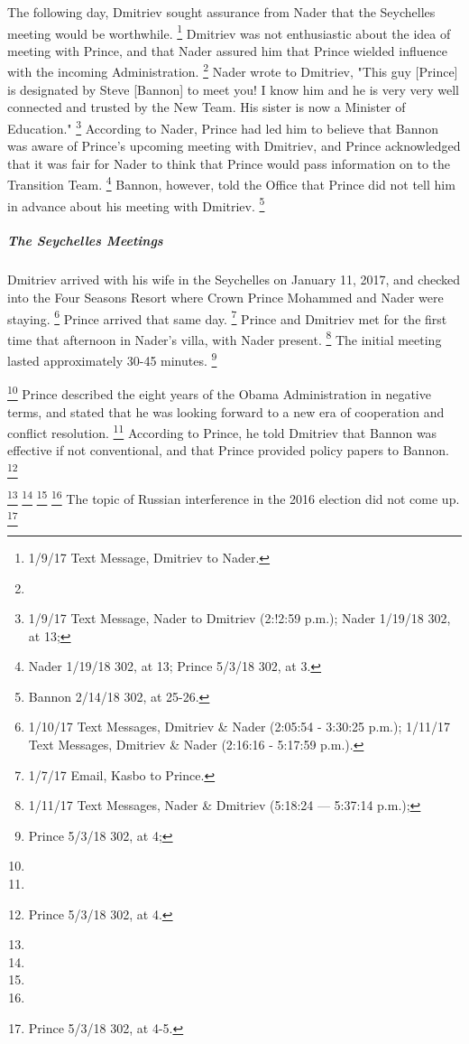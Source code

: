 The following day, Dmitriev sought assurance from Nader that the Seychelles meeting would be worthwhile.%
\footnote{1/9/17 Text Message, Dmitriev to Nader.}
Dmitriev was not enthusiastic about the idea of meeting with Prince, and that Nader assured him that Prince wielded influence with the incoming Administration.%
\footnote{}
Nader wrote to Dmitriev, "This guy [Prince] is designated by Steve [Bannon] to meet you!
I know him and he is very very well connected and trusted by the New Team.
His sister is now a Minister of Education."%
\footnote{1/9/17 Text Message, Nader to Dmitriev (2:!2:59 p.m.);
Nader 1/19/18 302, at 13;
}
According to Nader, Prince had led him to believe that Bannon was aware of Prince's upcoming meeting with Dmitriev, and Prince acknowledged that it was fair for Nader to think that Prince would pass information on to the Transition Team.%
\footnote{Nader 1/19/18 302, at 13;  Prince 5/3/18 302, at 3.}
Bannon, however, told the Office that Prince did not tell him in advance about his meeting with Dmitriev.%
\footnote{Bannon 2/14/18 302, at 25-26.}

\subparagraph{The Seychelles Meetings}

Dmitriev arrived with his wife in the Seychelles on January 11, 2017, and checked into the Four Seasons Resort where Crown Prince Mohammed and Nader were staying.%
\footnote{1/10/17 Text Messages, Dmitriev \& Nader (2:05:54 - 3:30:25 p.m.);
1/11/17 Text Messages, Dmitriev \& Nader (2:16:16 - 5:17:59 p.m.).}
Prince arrived that same day.%
\footnote{1/7/17 Email, Kasbo to Prince.}
Prince and Dmitriev met for the first time that afternoon in Nader's villa, with Nader present.%
\footnote{1/11/17 Text Messages, Nader \& Dmitriev (5:18:24 — 5:37:14 p.m.);
}
The initial meeting lasted approximately 30-45 minutes.%
\footnote{Prince 5/3/18 302, at 4; }

\footnote{}
Prince described the eight years of the Obama Administration in negative terms, and stated that he was looking forward to a new era of cooperation and conflict resolution.%
\footnote{}
According to Prince, he told Dmitriev that Bannon was effective if not conventional, and that Prince provided policy papers to Bannon.%
\footnote{Prince 5/3/18 302, at 4.}

\footnote{}
\footnote{}
\footnote{}
\footnote{}
The topic of Russian interference in the 2016 election did not come up.%
\footnote{Prince 5/3/18 302, at 4-5.}

